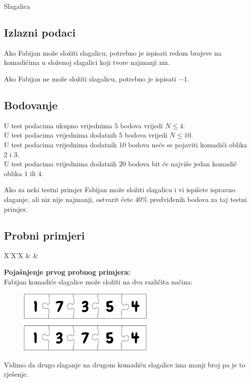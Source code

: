 \begin{statement}[
  problempoints=70,
  timelimit=1 sekunda,
  memorylimit=512 MiB,
]{Slagalica}
\subsection*{Izlazni podaci}
Ako Fabijan može složiti slagalicu, potrebno je ispisati redom brojeve na
komadićima u složenoj slagalici koji tvore najmanji niz.

Ako Fabijan ne može složiti slagalicu, potrebno je ispisati $-1$.

\subsection*{Bodovanje}
U test podacima ukupno vrijednima $5$ bodova vrijedi $N \le 4$.\\
U test podacima vrijednima dodatnih $5$ bodova vrijedi $N \le 10$.\\
U test podacima vrijednima dodatnih $10$ bodova neće se pojaviti komadići oblika $2$ i $3$.\\
U test podacima vrijednima dodatnih $20$ bodova bit će najviše jedan komadić oblika $1$ ili $4$.

Ako za neki testni primjer Fabijan može složiti slagalicu i vi ispišete ispravno
slaganje, ali niz nije najmanji, ostvarit ćete $40\%$ predviđenih bodova za taj
testni primjer.


\subsection*{Probni primjeri}
\begin{tabularx}{\textwidth}{X'X'X}
 &
 &
\end{tabularx}

\textbf{Pojašnjenje prvog probnog primjera:}\\
Fabijan komadiće slagalice može složiti na dva različita načina:\\

\begin{figure}[H]
\centering
\includegraphics[width=0.6\textwidth]{img/sample_clarification.png}
\end{figure}
Vidimo da drugo slaganje na drugom komadiću slagalice ima manji broj pa je to
rješenje.

\end{statement}

